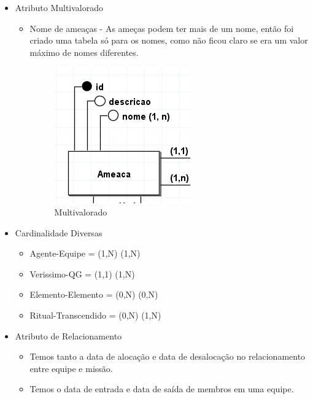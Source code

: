 \documentclass[12pt,a4paper]{report}
\begin{document}
\begin{itemize}
\begin{itemize}
        \item Atributo Multivalorado
            \begin{itemize}
                \item Nome de ameaças - As ameças podem ter mais de um nome, então foi criado uma tabela só para os nomes, como não ficou claro se era um valor máximo de nomes diferentes.
            \begin{figure}[H]
                \centering
                \includegraphics[width=0.5\linewidth]{multivalorado-nomes.png}
                \caption{Multivalorado}
                \label{fig:enter-label}
            \end{figure}
            \end{itemize}

            
        \item Cardinalidade Diversas
            \begin{itemize}
                \item Agente-Equipe = (1,N) (1,N)
                \item Verissimo-QG = (1,1) (1,N)
                \item Elemento-Elemento = (0,N) (0,N)
                \item Ritual-Transcendido = (0,N) (1,N)
            \end{itemize}
        \item Atributo de Relacionamento
            \begin{itemize}
                \item Temos tanto a data de alocação e data de desalocação no relacionamento entre equipe e missão.
                \item Temos o data de entrada e data de saída de membros em uma equipe.


\end{itemize}
\end{itemize}
\end{itemize}
\end{document}
